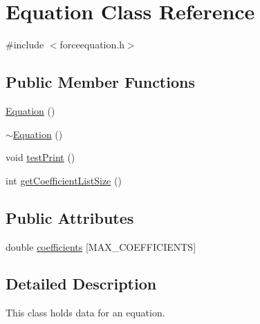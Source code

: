 \hypertarget{class_equation}{\section{Equation Class Reference}
\label{class_equation}
}


{\ttfamily \#include $<$forceequation.\-h$>$}

\subsection*{Public Member Functions}
\begin{DoxyCompactItemize}
\item 
\hyperlink{class_equation_a68511fc719250ed80f86c50de9136733}{Equation} ()
\item 
\hyperlink{class_equation_a097243d0dfd608330fc91f115a0d15bb}{$\sim$\-Equation} ()
\item 
void \hyperlink{class_equation_af6c9148998a4abe47f4a4215c51ce3c8}{test\-Print} ()
\item 
int \hyperlink{class_equation_abb01745ac8c816354d72ee529d2bddc0}{get\-Coefficient\-List\-Size} ()
\end{DoxyCompactItemize}
\subsection*{Public Attributes}
\begin{DoxyCompactItemize}
\item 
double \hyperlink{class_equation_a3a17ab6138a657d31dcc9f3e420a0cde}{coefficients} \mbox{[}M\-A\-X\-\_\-\-C\-O\-E\-F\-F\-I\-C\-I\-E\-N\-T\-S\mbox{]}
\end{DoxyCompactItemize}


\subsection{Detailed Description}
This class holds data for an equation. 

